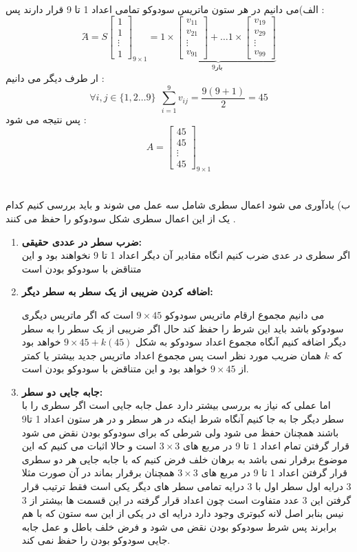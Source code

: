 \documentclass{article}
\begin{document}
\\
الف)می دانیم در هر ستون ماتریس سودوکو تمامی اعداد 1 تا 9 قرار دارند پس :
$$َA=S\begin{bmatrix}
1\\
1\\
\vdots\\
1\end{bmatrix}_{9\times1}=\underbrace{1\times \begin{bmatrix}
		v_{11}\\
		v_{21}\\
		\vdots\\
	v_{91}\end{bmatrix}+\ldots1\times\begin{bmatrix}
	v_{19}\\
	v_{29}\\
	\vdots\\
	v_{99}\end{bmatrix} }_\text{9بار }$$
ار طرف دیگر می دانیم :
$$\forall i,j\in \{1,2\ldots9\} \ \ \sum_{i=1}^{9}v_{ij}=\frac{9(9+1)}{2}=45$$
پس نتیجه می شود :
$$A=\begin{bmatrix}
45\\
45\\
\vdots\\
45
\end{bmatrix}_{9\times1}$$\\
\\
ب) یادآوری می شود اعمال سطری شامل سه عمل می شوند و باید بررسی کنیم کدام یک از این اعمال سطری شکل سودوکو را حفظ می کنند .
\begin{enumerate}
\item {\bf ضرب سطر در عددی حقیقی:}\\
اگر سطری در عدی ضرب کنیم انگاه مقادیر آن دیگر اعداد 1 تا 9 نخواهند بود و این متناقض با سودوکو بودن است
\item {\bf اضافه کردن ضریبی از یک سطر به سطر دیگر:}

می دانیم مجموع ارقام ماتریس سودوکو 
$9\times45$
است که اگر ماتریس دیگری سودوکو باشد باید این شرط را حفظ کند حال اگر ضریبی از یک سطر را به سطر دیگر اضافه کنیم آنگاه مجموع اعداد سودوکو به شکل 
$9\times45+k(45)$
خواهد بود که
$k$
همان ضریب مورد نظر است پس مجموع اعداد ماتریس جدید بیشتر یا کمتر از
$9\times45$
خواهد بود و این متناقض با سودوکو بودن است.
\item{\bf جابه جایی دو سطر:}\\
اما عملی که نیاز به بررسی بیشتر دارد عمل جابه جایی است اگر سطری را با سطر دیگر جا به جا کنیم آنگاه شرط اینکه در هر سطر و در هر ستون اعداد 1 تا9 باشند همچنان حفظ می شود ولی شرطی که برای سودوکو بودن نقض می شود قرار گرفتن  تمام اعداد 1 تا 9 در مربع های 
$3\times3$
است و حالا اثبات می کنیم که این موضوع برقرار نمی باشد به برهان خلف فرض کنیم که با جابه جایی هر دو سطری قرار گرفتن اعداد 1 تا 9 در مربع های 
$3\times3$
همچنان برقرار بماند در آن صورت مثلا 3 درایه اول سطر اول با 3 درایه تمامی سطر های دیگر یکی است فقط ترتیب قرار گرفتن این 3 عدد متفاوت است چون اعداد قرار گرفته در این قسمت ها بیشتر از 3 نیس بنابر اصل لانه کبوتری وجود دارد درایه ای در یکی از این سه ستون که با هم برابرند پس شرط سودوکو بودن نقض می شود و فرض خلف باطل و عمل جابه جایی سودوکو بودن را حفظ نمی کند.   

\end{enumerate}
\end{document}
